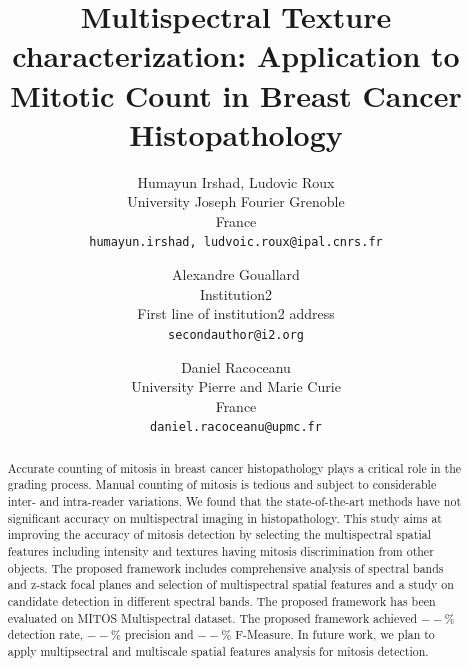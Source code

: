 \documentclass[10pt,twocolumn,letterpaper]{article}
\begin{document}
\title{Multispectral Texture characterization: Application to Mitotic Count in Breast Cancer Histopathology}

\author{Humayun Irshad, Ludovic Roux\\
	University Joseph Fourier Grenoble \\ France\\
	{\tt\small {humayun.irshad, ludvoic.roux}@ipal.cnrs.fr} \\
	\and 
	Alexandre Gouallard\\
	Institution2\\ First line of institution2 address\\
	{\tt\small secondauthor@i2.org} \\
	\and
	Daniel Racoceanu\\
	University Pierre and Marie Curie \\ France\\
	{\tt\small daniel.racoceanu@upmc.fr}
}

\maketitle

\begin{abstract}
Accurate counting of mitosis in breast cancer histopathology plays a critical role in the grading process. Manual counting of mitosis is tedious and subject to considerable inter- and intra-reader variations. We found that the state-of-the-art methods have not significant accuracy on multispectral imaging in histopathology. This study aims at improving the accuracy of mitosis detection by selecting the multispectral spatial features including intensity and textures having mitosis discrimination from other objects. The proposed framework includes comprehensive analysis of spectral bands and z-stack focal planes and selection of multispectral spatial features and a study on candidate detection in different spectral bands. The proposed framework has been evaluated on MITOS Multispectral dataset. The proposed framework achieved $--\%$ detection rate, $--\%$ precision and $--\%$ F-Measure. In future work, we plan to apply multipsectral and multiscale spatial features analysis for mitosis detection.
\end{abstract}

\end{document}
